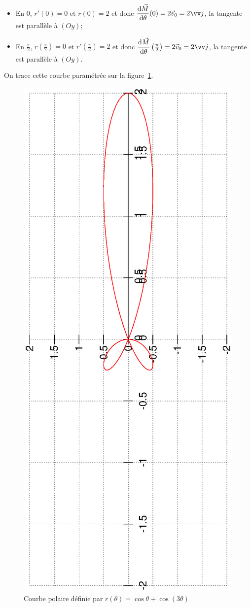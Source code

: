 \begin{itemize}
\item En $0$, $r'(0)=0$ et $r(0)=2$ et donc $\derived{\vec{M}}{\theta}(0)=2 \vec{v}_0=2 \vj$, la tangente est parallèle à $(Oy)$;
\item En $\frac{\pi}{2}$, $r\left(\frac{\pi}{2}\right)=0$ et $r'\left(\frac{\pi}{2}\right)=2$ et donc $\derived{\vec{M}}{\theta}\left(\frac{\pi}{2}\right)=2 \vec{v}_0=2 \vj$, la tangente est parallèle à $(Oy)$.
\end{itemize}
On trace cette courbe paramétrée sur la figure~\ref{fig:pol}.
\begin{figure}
 \centering
 \includegraphics[angle=-90,width=\textwidth,scale=1]{courbepolaire.ps}
 \caption{Courbe polaire définie par $r(\theta)=\cos\theta+\cos(3\theta)$}
 \label{fig:pol}
\end{figure}